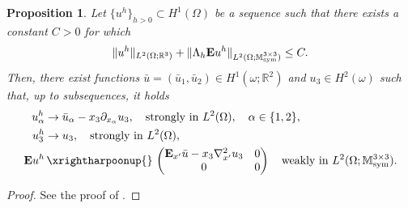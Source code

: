 \documentclass[reqno,10pt]{amsart}
\numberwithin{equation}{section}
\newtheorem{proposition}[theorem]{Proposition}
\theoremstyle{remark}
\newcommand{\M}{\mathbb{M}}
\newcommand{\R}{\mathbb{R}}
\DeclareMathOperator{\sym}{sym}
\newcommand{\strong}{\to}
\newcommand{\weak}{\,\xrightharpoonup{}\,}
\newcommand{\E}{{\bf E}}
\newcommand{\D}{\nabla}
\begin{document}
\begin{proposition} \label{two-scale weak limit of scaled strains - 2x2 submatrix}
Let $\{u^h\}_{h>0} \subset H^1(\Omega)$ be a sequence such that there exists a constant $C>0$ for which 
\begin{equation*}
	\|u^h\|_{L^2(\Omega;\R^3)}+\|\Lambda_h {\E}u^h\|_{L^2(\Omega;\M^{3 \times 3}_{\sym})} \leq C.
\end{equation*}
Then, there exist functions $\bar{u} = (\bar{u}_1, \bar{u}_2) \in H^1(\omega;\R^2)$ and $u_3 \in H^2(\omega)$ such that, up to subsequences, it holds 
\begin{align*}
	u^h_{\alpha} & \strong \bar{u}_{\alpha}-x_3 \partial_{x_\alpha}u_3, \quad \text{strongly in }L^2(\Omega), \quad \alpha \in \{1, 2\},\\
	u^h_3 & \strong u_3, \quad \text{strongly in }L^2(\Omega),\\
	{\E}u^h & \weak \begin{pmatrix} {\E}_{x'}\bar{u} - x_3 {\D}^2_{x'}u_3 & 0 \\ 0 & 0 \end{pmatrix} \quad \text{weakly in }L^2(\Omega;\M^{3 \times 3}_{\sym}).
\end{align*}
\end{proposition}

\begin{proof}
See the proof of \cite[Theorem 1.4.-1]{ciarlet1997mathematical}.
\end{proof} 
\end{document}

